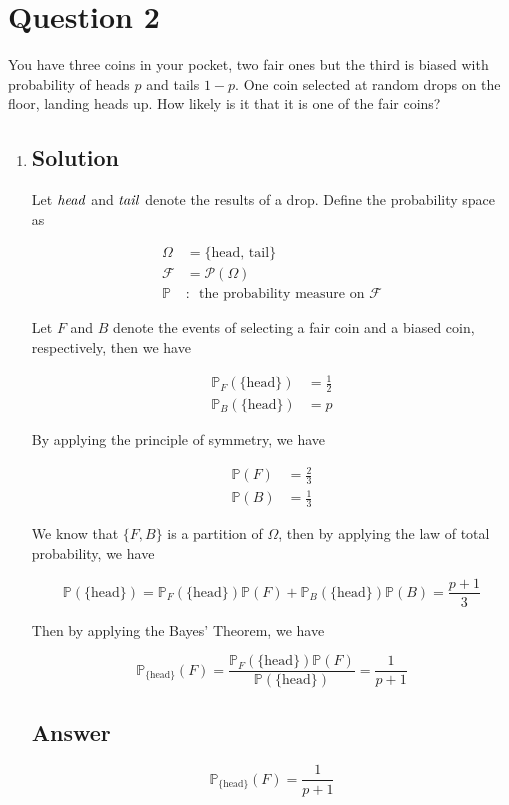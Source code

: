 \documentclass[12pt]{article}
\newcommand{\bP}{\mathbb{P}}
\begin{document}
	
	\section*{Question 2}
	
	\noindent You have three coins in your pocket, two fair ones but the third is biased with probability of heads $p$ and tails $1-p$. One coin selected at random drops on the floor, landing heads up. How likely is it that it is one of the fair coins?
	
	\begin{enumerate}[label={},leftmargin=0in]\item
		
		\subsection*{Solution}
		
			Let $\it{head}$ and $\it{tail}$ denote the results of a drop. Define the probability space as
		
			\[
			\begin{aligned}
				\Omega &= \{\mathrm{head},\,\mathrm{tail}\}\\
				\mathcal{F} &= \mathcal{P}(\Omega)\\
				\bP &:\enspace \text{the probability measure on $\mathcal{F}$}
			\end{aligned}
			\]
			
			Let $F$ and $B$ denote the events of selecting a fair coin and a biased coin, respectively, then we have
			
			\[
			\begin{aligned}
				\bP_F(\{\mathrm{head}\}) &= \frac{1}{2}\\
				\bP_B(\{\mathrm{head}\}) &= p
			\end{aligned}
			\]
			
			By applying the principle of symmetry, we have
			
			\[
			\begin{aligned}
				\bP(F) &= \frac{2}{3}\\
				\bP(B) &= \frac{1}{3}
			\end{aligned}
			\]
			
			We know that $\{F,B\}$ is a partition of $\Omega$, then by applying the law of total probability, we have
			
			\[\bP(\{\mathrm{head}\}) = \bP_F(\{\mathrm{head}\})\bP(F) + \bP_B(\{\mathrm{head}\})\bP(B) = \frac{p + 1}{3}\]
			
			Then by applying the Bayes’ Theorem, we have
			
			\[{\bP_{\{\mathrm{head}\}}}(F) = \frac{\bP_F(\{\mathrm{head}\})\bP(F)}{\bP(\{\mathrm{head}\})} = \frac{1}{p+1}\]
		
		\subsection*{Answer}
		
			\[\boxed{{\bP_{\{\mathrm{head}\}}}(F) = \frac{1}{p+1}}\]

	\end{enumerate}
\end{document}
